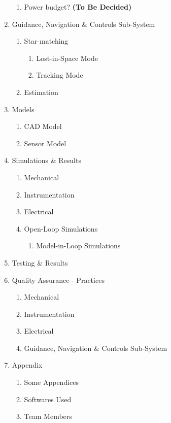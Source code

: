 \begin{enumerate}
\begin{enumerate}
        \item Power budget? \textbf{(To Be Decided)}
    \end{enumerate} 
    \item Guidance, Navigation \& Controls Sub-System
    \begin{enumerate}
        \item Star-matching
        \begin{enumerate}
            \item Lost-in-Space Mode
            \item Tracking Mode
        \end{enumerate}
        \item Estimation
    \end{enumerate}
    \item Models
    \begin{enumerate}
        \item CAD Model
        \item Sensor Model
    \end{enumerate}
    \item Simulations \& Results
    \begin{enumerate}
        \item Mechanical
        \item Instrumentation
        \item Electrical
        \item Open-Loop Simulations
        \begin{enumerate}
            \item Model-in-Loop Simulations
        \end{enumerate}
    \end{enumerate}
    \item Testing \& Results
    \item Quality Assurance - Practices
    \begin{enumerate}
        \item Mechanical
        \item Instrumentation
        \item Electrical
        \item Guidance, Navigation \& Controls Sub-System
    \end{enumerate}
    \item Appendix
    \begin{enumerate}
        \item Some Appendices
        \item Softwares Used
        \item Team Members
    \end{enumerate}
\end{enumerate}
